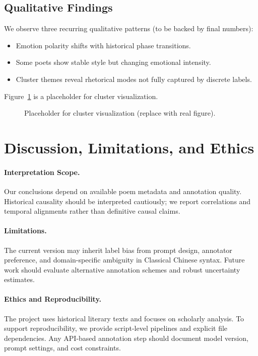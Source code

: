 \documentclass[11pt]{article}
\begin{document}
\subsection{Qualitative Findings}

We observe three recurring qualitative patterns (to be backed by final numbers):
\begin{itemize}
    \item Emotion polarity shifts with historical phase transitions.
    \item Some poets show stable style but changing emotional intensity.
    \item Cluster themes reveal rhetorical modes not fully captured by discrete labels.
\end{itemize}

Figure~\ref{fig:cluster_placeholder} is a placeholder for cluster visualization.

\begin{figure}[t]
\centering
\fbox{\rule{0pt}{3.2cm}\rule{0.95\linewidth}{0pt}}
\caption{Placeholder for cluster visualization (replace with real figure).}
\label{fig:cluster_placeholder}
\end{figure}

\section{Discussion, Limitations, and Ethics}

\paragraph{Interpretation Scope.}
Our conclusions depend on available poem metadata and annotation quality.
Historical causality should be interpreted cautiously; we report correlations and temporal alignments rather than definitive causal claims.

\paragraph{Limitations.}
The current version may inherit label bias from prompt design, annotator preference, and domain-specific ambiguity in Classical Chinese syntax.
Future work should evaluate alternative annotation schemes and robust uncertainty estimates.

\paragraph{Ethics and Reproducibility.}
The project uses historical literary texts and focuses on scholarly analysis.
To support reproducibility, we provide script-level pipelines and explicit file dependencies.
Any API-based annotation step should document model version, prompt settings, and cost constraints.
\end{document}
